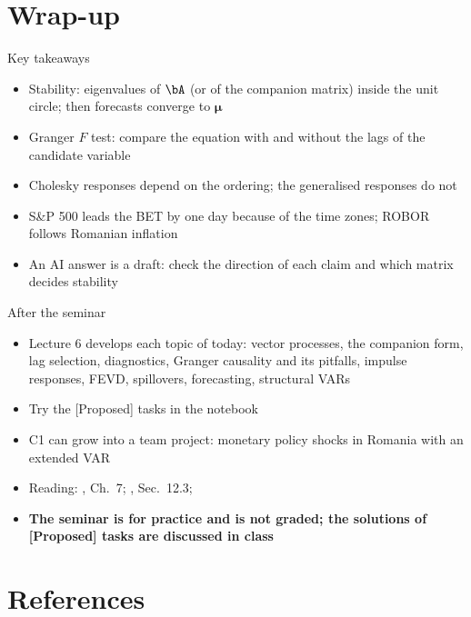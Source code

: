 \section{Wrap-up}

\begin{frame}{Key takeaways}
\itemsize{\small}
\begin{itemize}
    \item Stability: eigenvalues of $\bA$ (or of the companion matrix) inside the unit circle; then forecasts converge to $\boldsymbol{\mu}$
    \item Granger $F$ test: compare the equation with and without the lags of the candidate variable
    \item Cholesky responses depend on the ordering; the generalised responses do not
    \item S\&P 500 leads the BET by one day because of the time zones; ROBOR follows Romanian inflation
    \item An AI answer is a draft: check the direction of each claim and which matrix decides stability
\end{itemize}
\end{frame}

\begin{frame}{After the seminar}
\itemsize{\small}
\begin{itemize}
    \item Lecture 6 develops each topic of today: vector processes, the companion form, lag selection, diagnostics, Granger causality and its pitfalls, impulse responses, FEVD, spillovers, forecasting, structural VARs
    \item Try the [Proposed] tasks in the notebook
    \item C1 can grow into a team project: monetary policy shocks in Romania with an extended VAR
    \item Reading: , Ch.~7; , Sec.~12.3; 
    \item \textbf{The seminar is for practice and is not graded; the solutions of [Proposed] tasks are discussed in class}
\end{itemize}
\end{frame}


\section{References}

